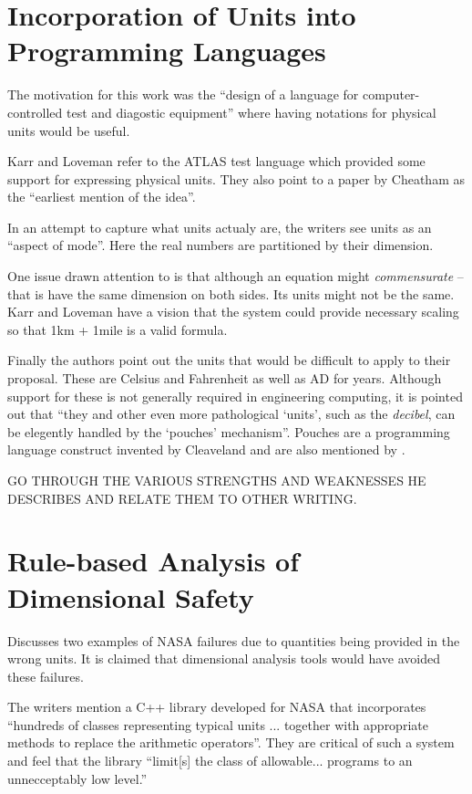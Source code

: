 \documentclass[a4paper]{article}
\begin{document}
\section{Incorporation of Units into Programming Languages 
\cite{ME_karrLoveman}}

The motivation for this work was the ``design of a language for 
computer-controlled test and diagostic equipment'' where having notations
for physical units would be useful.

Karr and Loveman refer to the ATLAS test language which provided some support
for expressing physical units. They also point to a paper by Cheatham as the 
``earliest mention of the idea''. 

In an attempt to capture what units actualy are, the writers see units as an
``aspect of mode''. Here the real numbers are partitioned by their dimension.

One issue drawn attention to is that although an equation might 
\emph{commensurate} -- that is have the same dimension on both sides. Its units
might not be the same. Karr and Loveman have a vision that the system could 
provide necessary scaling so that 1km + 1mile is a valid formula.



Finally the authors point out the units that would be difficult to apply
to their proposal. These are Celsius and Fahrenheit as well as AD for years.
Although support for these is not generally required in engineering 
computing, it is pointed out that ``they and other even more pathological 
`units', such as the \emph{decibel}, can be elegently handled by the 
`pouches' mechanism''. Pouches are a programming language construct invented by
Cleaveland and are also mentioned by \cite{ME_trg}.


GO THROUGH THE VARIOUS STRENGTHS AND WEAKNESSES HE DESCRIBES AND RELATE THEM TO 
OTHER WRITING.


\section{Rule-based Analysis of Dimensional Safety \cite{ME_grosu}}

Discusses two examples of NASA failures due to quantities being provided in 
the wrong units. It is claimed that dimensional analysis tools would have 
avoided these failures.

The writers mention a C++ library developed for NASA that incorporates
``hundreds of classes representing typical units ... together with appropriate
methods to replace the arithmetic operators''. They are critical of such a 
system and feel that the library ``limit[s] the class of allowable... programs 
to an unnecceptably low level.''
\end{document}
